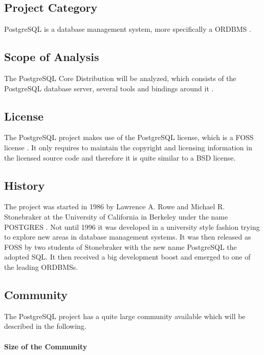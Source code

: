 \subsection{Project Category}

PostgreSQL is a database management system, more specifically a \ac{ORDBMS}
\cite{PostgreSQLAbout}.

\subsection{Scope of Analysis}

The PostgreSQL Core Distribution will be analyzed, which consists of the
PostgreSQL database server, several tools and bindings around it
\cite{PostgreSQLDownload}.

\subsection{License}

The PostgreSQL project makes use of the PostgreSQL license, which is a
\ac{FOSS} license \cite{PostgreSQLFAQ,PostgreSQLLicense}. It only requires to
maintain the copyright and licensing information in the licensed source code
and therefore it is quite similar to a BSD license.

\subsection{History}

The project was started in 1986 by Lawrence A. Rowe and Michael R. Stonebraker
at the University of California in Berkeley under the name POSTGRES
\cite{PostgreSQLHistory}. Not until 1996 it was developed in a university style
fashion trying to explore new areas in database management systems. It was then
released as \ac{FOSS} by two students of Stonebraker with the new name
PostgreSQL the adopted \ac{SQL}. It then received a big development boost and
emerged to one of the leading \acp{ORDBMS}.

\subsection{Community}

The PostgreSQL project has a quite large community available which will be
described in the following.

\paragraph{Size of the Community}

